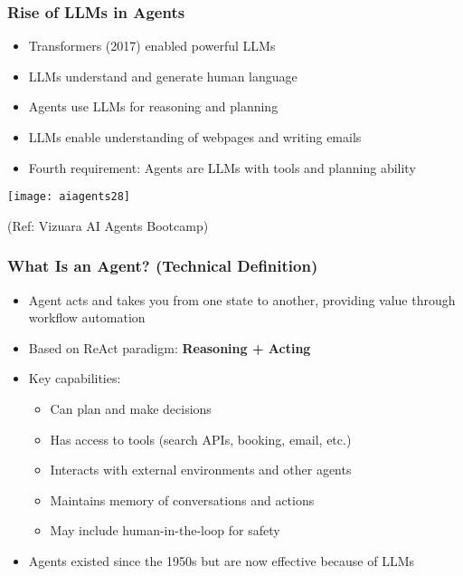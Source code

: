 \begin{frame}[fragile]\frametitle{Rise of LLMs in Agents}

      \begin{itemize}
        \item Transformers (2017) enabled powerful LLMs
        \item LLMs understand and generate human language
        \item Agents use LLMs for reasoning and planning
        \item LLMs enable understanding of webpages and writing emails
        \item Fourth requirement: Agents are LLMs with tools and planning ability
      \end{itemize}

		\begin{center}
		\texttt{[image: aiagents28]}
		
		{\tiny (Ref: Vizuara AI Agents Bootcamp)}
		\end{center}	

\end{frame}



\begin{frame}[fragile]\frametitle{What Is an Agent? (Technical Definition)}
\begin{itemize}
    \item Agent acts and takes you from one state to another, providing value through workflow automation
    \item Based on ReAct paradigm: \textbf{Reasoning + Acting}
    \item Key capabilities:
    \begin{itemize}
        \item Can plan and make decisions
        \item Has access to tools (search APIs, booking, email, etc.)
        \item Interacts with external environments and other agents
        \item Maintains memory of conversations and actions
        \item May include human-in-the-loop for safety
    \end{itemize}
    \item Agents existed since the 1950s but are now effective because of LLMs
\end{itemize}
\end{frame}


